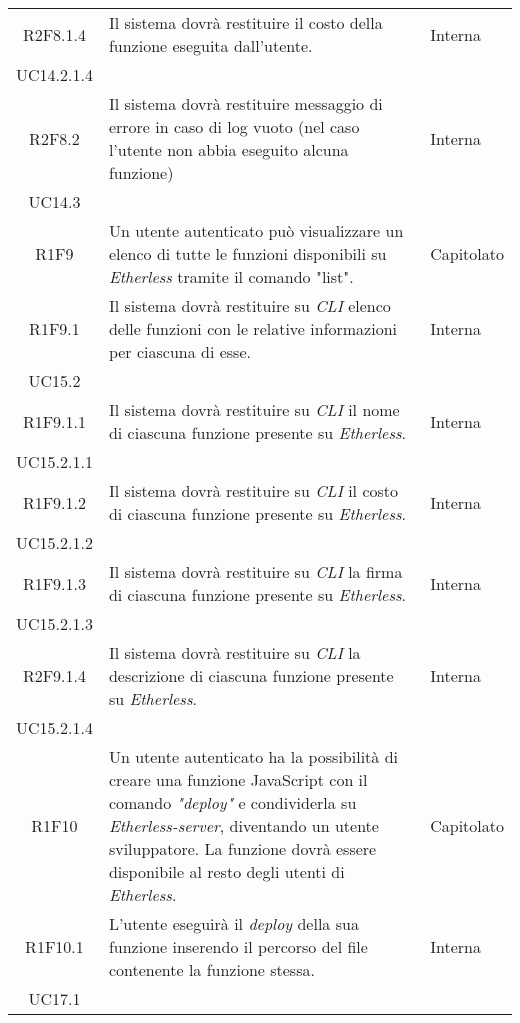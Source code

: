 \begin{longtable}{|c|p{8cm}|C{2cm}|}
	R2F8.1.4 &  Il sistema dovrà restituire il costo della funzione eseguita dall'utente. & \centering Interna \\ UC14.2.1.4 \tabularnewline

	R2F8.2 &  Il sistema dovrà restituire messaggio di errore in caso di log vuoto (nel caso l'utente non abbia eseguito alcuna funzione) & \centering Interna \\ UC14.3 \tabularnewline

	R1F9 &  Un utente autenticato può visualizzare un elenco di tutte le funzioni disponibili su \textit{Etherless} tramite il comando "list". & Capitolato \\

	R1F9.1 &  Il sistema dovrà restituire su \textit{CLI\glo} elenco delle funzioni con le relative informazioni per ciascuna di esse. & \centering Interna \\ UC15.2 \tabularnewline

	R1F9.1.1 &  Il sistema dovrà restituire su \textit{CLI\glo} il nome di ciascuna funzione presente su \textit{Etherless}. & \centering Interna \\ UC15.2.1.1 \tabularnewline

	R1F9.1.2 &  Il sistema dovrà restituire su \textit{CLI\glo} il costo di ciascuna funzione presente su \textit{Etherless}. & \centering Interna \\ UC15.2.1.2 \tabularnewline

	R1F9.1.3 &  Il sistema dovrà restituire su \textit{CLI\glo} la firma di ciascuna funzione presente su \textit{Etherless}. & \centering Interna \\ UC15.2.1.3 \tabularnewline

	R2F9.1.4 &  Il sistema dovrà restituire su \textit{CLI\glo} la descrizione di ciascuna funzione presente su \textit{Etherless}. & \centering Interna \\ UC15.2.1.4 \tabularnewline

	R1F10 &  Un utente autenticato ha la possibilità di creare una funzione JavaScript con il comando \textit{"deploy\glos"} e condividerla su \textit{Etherless-server}, diventando un utente sviluppatore. La funzione dovrà essere disponibile al resto degli utenti di \textit{Etherless}. & Capitolato \\

	R1F10.1 &  L'utente eseguirà il \textit{deploy\glo} della sua funzione inserendo il percorso del file contenente la funzione stessa. & \centering Interna \\ UC17.1 \tabularnewline


\end{longtable}
